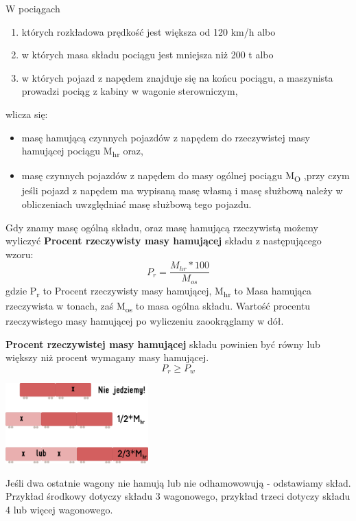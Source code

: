 \begin{tcolorbox}[colback=red!5!white,colframe=red!75!black,width=18cm,title=Uwaga!]
	W pociągach
	\begin{enumerate}
		\item których rozkładowa prędkość jest większa od 120 km/h albo
		\item w których masa składu pociągu jest mniejsza niż 200 t albo
		\item w których pojazd z napędem znajduje się na końcu pociągu, a maszynista prowadzi pociąg z kabiny w wagonie sterowniczym,
	\end{enumerate}
	wlicza się:
	\begin{itemize}
		\item masę hamującą czynnych pojazdów z napędem do rzeczywistej masy hamującej pociągu M\textsubscript{hr} oraz,
		\item masę czynnych pojazdów z napędem do masy ogólnej pociągu M\textsubscript{O} ,przy czym jeśli pojazd z napędem ma wypisaną masę własną i masę służbową należy w obliczeniach uwzględniać masę służbową tego pojazdu.
	\end{itemize}
	\label{def:masa}
\end{tcolorbox}

Gdy znamy masę ogólną składu, oraz masę hamującą rzeczywistą możemy wyliczyć \textbf{Procent rzeczywisty masy hamującej} składu z następującego wzoru: 
\[  P_{r}=\frac{M_{hr}*100}{M_{os}}   \label{def:pr} \] 
gdzie P\textsubscript{r} to Procent rzeczywisty masy hamującej, M\textsubscript{hr} to Masa hamująca rzeczywista w tonach, zaś M\textsubscript{os} to masa ogólna składu. Wartość procentu rzeczywistego masy hamującej po wyliczeniu zaookrąglamy w dół.

\textbf{Procent rzeczywistej masy hamującej} składu powinien być równy lub większy niż procent wymagany masy hamującej.
\[  P_{r} \ge P_{w}   \] 

\begin{marginfigure}
	\includegraphics[width=5.5cm]{skryptkierownik-img/zmniejszenie-mhr.png}
	\caption{Jeśli dwa ostatnie wagony nie hamują lub nie odhamowowują - odstawiamy skład. Przykład środkowy dotyczy składu 3 wagonowego, przykład trzeci dotyczy składu 4 lub więcej wagonowego.}
\end{marginfigure}

